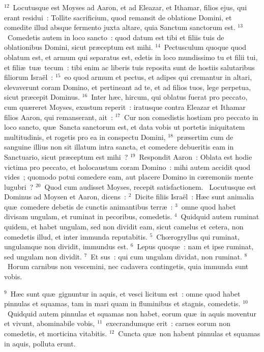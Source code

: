 ${}^{12}$~Locutusque est Moyses ad Aaron, et ad Eleazar, et Ithamar, filios ejus, qui erant residui~: Tollite sacrificium, quod remansit de oblatione Domini, et comedite illud absque fermento juxta altare, quia Sanctum sanctorum est.
${}^{13}$~Comedetis autem in loco sancto~: quod datum est tibi et filiis tuis de oblationibus Domini, sicut pr\ae ceptum est mihi.
${}^{14}$~Pectusculum quoque quod oblatum est, et armum qui separatus est, edetis in loco mundissimo tu et filii tui, et fili\ae\ tu\ae\ tecum~: tibi enim ac liberis tuis reposita sunt de hostiis salutaribus filiorum Isra\"el~:
${}^{15}$~eo quod armum et pectus, et adipes qui cremantur in altari, elevaverunt coram Domino, et pertineant ad te, et ad filios tuos, lege perpetua, sicut pr\ae cepit Dominus.
${}^{16}$~Inter h\ae c, hircum, qui oblatus fuerat pro peccato, cum qu\ae reret Moyses, exustum reperit~: iratusque contra Eleazar et Ithamar filios Aaron, qui remanserant, ait~:
${}^{17}$~Cur non comedistis hostiam pro peccato in loco sancto, qu\ae\ Sancta sanctorum est, et data vobis ut portetis iniquitatem multitudinis, et rogetis pro ea in conspectu Domini,
${}^{18}$~pr\ae sertim cum de sanguine illius non sit illatum intra sancta, et comedere debueritis eam in Sanctuario, sicut pr\ae ceptum est mihi~?
${}^{19}$~Respondit Aaron~: Oblata est hodie victima pro peccato, et holocaustum coram Domino~: mihi autem accidit quod vides~; quomodo potui comedere eam, aut placere Domino in c\ae remoniis mente lugubri~?
${}^{20}$~Quod cum audisset Moyses, recepit satisfactionem.
~\lettrine[lines=10,image=true,loversize=0.05,lraise=-0.03]{L}{}ocutusque est Dominus ad Moysen et Aaron, dicens~:
${}^{2}$~Dicite filiis Isra\"el~: H\ae c sunt animalia qu\ae\ comedere debetis de cunctis animantibus terr\ae~:
${}^{3}$~omne quod habet divisam ungulam, et ruminat in pecoribus, comedetis.
${}^{4}$~Quidquid autem ruminat quidem, et habet ungulam, sed non dividit eam, sicut camelus et cetera, non comedetis illud, et inter immunda reputabitis.
${}^{5}$~Chœrogryllus qui ruminat, ungulamque non dividit, immundus est.
${}^{6}$~Lepus quoque~: nam et ipse ruminat, sed ungulam non dividit.
${}^{7}$~Et sus~: qui cum ungulam dividat, non ruminat.
${}^{8}$~Horum carnibus non vescemini, nec cadavera contingetis, quia immunda sunt vobis.


${}^{9}$~H\ae c sunt qu\ae\ gignuntur in aquis, et vesci licitum est~: omne quod habet pinnulas et squamas, tam in mari quam in fluminibus et stagnis, comedetis.
${}^{10}$~Quidquid autem pinnulas et squamas non habet, eorum qu\ae\ in aquis moventur et vivunt, abominabile vobis,
${}^{11}$~execrandumque erit~: carnes eorum non comedetis, et morticina vitabitis.
${}^{12}$~Cuncta qu\ae\ non habent pinnulas et squamas in aquis, polluta erunt.


